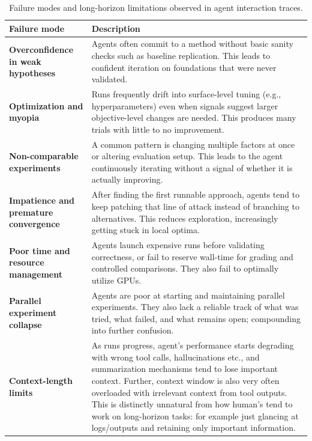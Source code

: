 \documentclass[11pt]{article}
\theoremstyle{plain}
\theoremstyle{definition}
\theoremstyle{remark}
\begin{document}
\begin{table}[t]
\centering
\small
\renewcommand{\arraystretch}{1.35}

{
\begin{tabularx}{\textwidth}{@{}%
  >{\raggedright\arraybackslash}p{4.2cm}%
  >{\raggedright\arraybackslash}X@{}}
\toprule
\rowcolor{white}\textbf{Failure mode} & \textbf{Description} \\
\midrule
\textbf{Overconfidence in weak hypotheses} &
Agents often commit to a method without basic sanity checks such as baseline replication. This leads to confident iteration on foundations that were never validated. \\

\textbf{Optimization and myopia} &
Runs frequently drift into surface-level tuning (e.g., hyperparameters) even when signals suggest larger objective-level changes are needed. This produces many trials with little to no improvement. \\

\textbf{Non-comparable experiments} &
A common pattern is changing multiple factors at once or altering evaluation setup. This leads to the agent continuously iterating without a signal of whether it is actually improving. \\

\textbf{Impatience and premature convergence} &
After finding the first runnable approach, agents tend to keep patching that line of attack instead of branching to alternatives. This reduces exploration, increasingly getting stuck in local optima. \\

\textbf{Poor time and resource management} &
Agents launch expensive runs before validating correctness, or fail to reserve wall-time for grading and controlled comparisons. They also fail to optimally utilize GPUs. \\

\textbf{Parallel experiment collapse} &
Agents are poor at starting and maintaining parallel experiments. They also lack a reliable track of what was tried, what failed, and what remains open; compounding into further confusion.
\\

\textbf{Context-length limits} &
As runs progress, agent's performance starts degrading with wrong tool calls, hallucinations etc., and summarization mechanisms tend to lose important context. Further, context window is also very often overloaded with irrelevant context from tool outputs. This is distinctly unnatural from how human's tend to work on long-horizon tasks: for example just glancing at logs/outputs and retaining only important information. \\
\bottomrule
\end{tabularx}
}

\vspace{-8pt}
\caption{Failure modes and long-horizon limitations observed in agent interaction traces.}
\label{tab:failure_modes}
\end{table}
\end{document}
